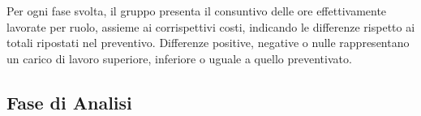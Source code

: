 \documentclass[../piano-di-progetto.tex]{subfiles}
\begin{document}
Per ogni fase svolta, il gruppo presenta il consuntivo delle ore effettivamente lavorate per ruolo, assieme ai corrispettivi costi, indicando le differenze rispetto ai totali ripostati nel preventivo. Differenze positive, negative o nulle rappresentano un carico di lavoro superiore, inferiore o uguale a quello preventivato.
\subsection{Fase di Analisi}%
\label{sub:fase_di_analisi}

\end{document}
